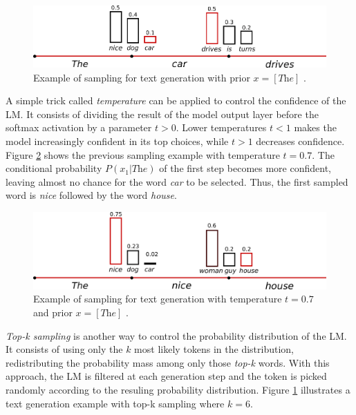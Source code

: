 \begin{figure}[!h]
 \centering
 \includegraphics[width=0.9\columnwidth]{imgs/background/sampling.png}
 \caption{Example of sampling for text generation with prior $x = [\textit{The}]$ \cite{platen2020}.}
 \label{fig:topk}
\end{figure}

A simple trick called \textit{temperature} can be applied to control the confidence of the LM. It consists of dividing the result of the model output layer before the softmax activation by a parameter $t > 0$. Lower temperatures $t < 1$ makes the model increasingly confident in its top choices, while $t > 1$ decreases confidence. Figure \ref{fig:temp} shows the previous sampling example with temperature $t = 0.7$. The conditional probability $P(x_1 | \textit{The})$ of the first step becomes more confident, leaving almost no chance for the word \textit{car} to be selected. Thus, the first sampled word is \textit{nice} followed by the word \textit{house}.

\begin{figure}[!h]
 \centering
 \includegraphics[width=0.9\columnwidth]{imgs/background/temperature.png}
 \caption{Example of sampling for text generation with temperature $t = 0.7$ and
 prior $x = [\textit{The}]$ \cite{platen2020}.}
 \label{fig:temp}
\end{figure}

\textit{Top-k sampling} \cite{fan2018hierarchical} is another way to control the probability distribution of the LM. It consists of using only the $k$ most likely tokens in the distribution, redistributing the probability mass among only those \textit{top-k} words. With this approach, the LM is filtered at each generation step and the token is picked randomly according to the resuling probability distribution. Figure \ref{fig:topk} illustrates a text generation example with top-k sampling where $k=6$.

